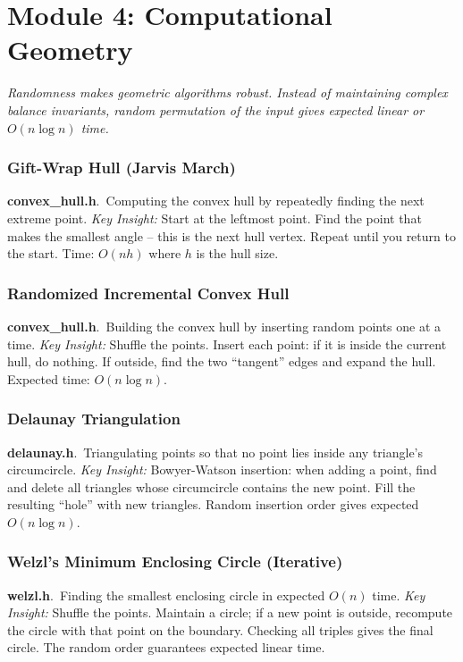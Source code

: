 \documentclass[11pt,a4paper]{article}
\newcommand{\algo}[2]{\textbf{#1}.\ #2}
\newcommand{\insight}{\textit{Key Insight: }}
\begin{document}
\section{Module 4: Computational Geometry}
\label{sec:geometry}

\textit{Randomness makes geometric algorithms robust. Instead of maintaining complex balance invariants, random permutation of the input gives expected linear or \(O(n \log n)\) time.}

\subsubsection{Gift-Wrap Hull (Jarvis March)}
\algo{convex\_hull.h}{Computing the convex hull by repeatedly finding the next extreme point.}
\insight Start at the leftmost point. Find the point that makes the smallest angle -- this is the next hull vertex. Repeat until you return to the start. Time: \(O(nh)\) where \(h\) is the hull size.

\subsubsection{Randomized Incremental Convex Hull}
\algo{convex\_hull.h}{Building the convex hull by inserting random points one at a time.}
\insight Shuffle the points. Insert each point: if it is inside the current hull, do nothing. If outside, find the two ``tangent'' edges and expand the hull. Expected time: \(O(n \log n)\).

\subsubsection{Delaunay Triangulation}
\algo{delaunay.h}{Triangulating points so that no point lies inside any triangle's circumcircle.}
\insight Bowyer-Watson insertion: when adding a point, find and delete all triangles whose circumcircle contains the new point. Fill the resulting ``hole'' with new triangles. Random insertion order gives expected \(O(n \log n)\).

\subsubsection{Welzl's Minimum Enclosing Circle (Iterative)}
\algo{welzl.h}{Finding the smallest enclosing circle in expected \(O(n)\) time.}
\insight Shuffle the points. Maintain a circle; if a new point is outside, recompute the circle with that point on the boundary. Checking all triples gives the final circle. The random order guarantees expected linear time.
\end{document}
